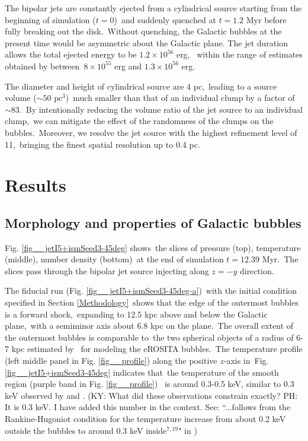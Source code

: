 \documentclass[fleqn,usenatbib,useAMS]{mnras}
\begin{document}
  The bipolar jets are constantly ejected from a cylindrical source starting from the beginning of simulation ($t=0$)\
  and suddenly quenched at $t=1.2$ Myr before fully breaking out the disk.\
  Without quenching, the Galactic bubbles at the present time would be asymmetric about the Galactic plane.
  The jet duration allows the total ejected energy to be $1.2\times10^{56}$ erg, \
  within the range of estimates obtained by \citet{Predehl2020} between\
  $8\times10^{55}$ erg and $1.3\times10^{56}$ erg.



  The diameter and height of cylindrical source are 4 pc,\
  leading to a source volume ($\sim 50 \text{ pc}^{3}$)\
  much smaller than that of an individual clump by a factor of $\sim 83$.\
  By intentionally reducing the volume ratio of the jet source to an individual clump,\
  we can mitigate the effect of the randomness of the clumps on the bubbles.\
  Moreover, we resolve the jet source with the highest refinement level of 11,\
  bringing the finest spatial resolution up to 0.4 pc.\

\section{Results}
\label{Results}

\subsection{Morphology and properties of Galactic bubbles}

 Fig. \ref{fig__jetI5+ismSeed3-45deg} shows\
 the slices of pressure (top), temperature (middle), number density (bottom)\
 at the end of simulation $t=12.39$ Myr.\
 The slices pass through the bipolar jet source injecting along $z=-y$ direction.

 The fiducial run (Fig. \ref{fig__jetI5+ismSeed3-45deg-a})\
 with the initial condition specified in Section \ref{Methodology}\
 shows that the edge of the outermost bubbles is a forward shock,\
 expanding to 12.5 kpc above and below the Galactic plane,\
 with a semiminor axis about 6.8 kpc on the plane.\
 The overall extent of the outermost bubbles is comparable to\
 the two spherical objects of a radius of 6-7 kpc estimated by \citet{Predehl2020}\
 for modeling the eROSITA bubbles.\
 The temperature profile (left middle panel in Fig. \ref{fig__profile}) along the positive $z$-axis in\
 Fig. \ref{fig__jetI5+ismSeed3-45deg} indicates that\
 the temperature of the smooth region (purple band in Fig. \ref{fig__profile})\ %
 is around 0.3-0.5 keV, similar to 0.3 keV observed by \citet{Miller2016} and \citet{Kataoka2018}. {\color{red} (KY: What did these observations constrain exactly?
PH: It is 0.3 keV. I have added this number in the context. See: ``...follows from the Rankine-Hugoniot condition for the temperature increase from about 0.2 keV outside the bubbles to around 0.3 keV inside$^{7,19}$" in \citealt{Predehl2020})}
\end{document}
